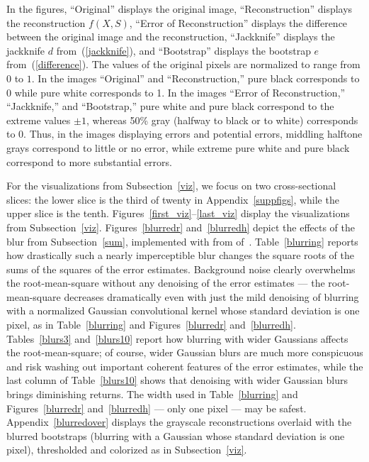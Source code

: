 \documentclass[article]{jdssv}
\begin{document}
In the figures,
``Original'' displays the original image,
``Reconstruction'' displays the reconstruction $f(X, S)$,
``Error of Reconstruction'' displays the difference between the original image
and the reconstruction,
``Jackknife'' displays the jackknife $d$ from~(\ref{jackknife}),
and ``Bootstrap'' displays the bootstrap $e$ from~(\ref{difference}).
The values of the original pixels are normalized to range from $0$ to $1$.
In the images ``Original'' and ``Reconstruction,''
pure black corresponds to 0 while pure white corresponds to 1.
In the images ``Error of Reconstruction,'' ``Jackknife,'' and ``Bootstrap,''
pure white and pure black correspond to the extreme values $\pm 1$,
whereas 50\% gray (halfway to black or to white) corresponds to 0.
Thus, in the images displaying errors and potential errors,
middling halftone grays correspond to little or no error, while
extreme pure white and pure black correspond to more substantial errors.

For the visualizations from Subsection~\ref{viz},
we focus on two cross-sectional slices:
the lower slice is the third of twenty in Appendix~\ref{suppfigs},
while the upper slice is the tenth.
Figures~\ref{first_viz}--\ref{last_viz} display the visualizations
from Subsection~\ref{viz}.
Figures~\ref{blurredr} and~\ref{blurredh} depict the effects
of the blur from Subsection~\ref{sum}, implemented
with 
from  of~\citet{scikit-image}.
Table~\ref{blurring} reports how drastically
such a nearly imperceptible blur changes
the square roots of the sums of the squares of the error estimates.
Background noise clearly overwhelms the root-mean-square without any denoising
of the error estimates --- the root-mean-square decreases dramatically
even with just the mild denoising of blurring
with a normalized Gaussian convolutional kernel
whose standard deviation is one pixel, as in Table~\ref{blurring}
and Figures~\ref{blurredr} and~\ref{blurredh}.
Tables~\ref{blurs3} and~\ref{blurs10} report how blurring with wider Gaussians
affects the root-mean-square; of course, wider Gaussian blurs
are much more conspicuous and risk washing out important coherent features
of the error estimates, while the last column of Table~\ref{blurs10} shows
that denoising with wider Gaussian blurs brings diminishing returns.
The width used in Table~\ref{blurring} and Figures~\ref{blurredr}
and~\ref{blurredh} --- only one pixel --- may be safest.
Appendix~\ref{blurredover} displays the grayscale reconstructions overlaid
with the blurred bootstraps (blurring with a Gaussian whose standard deviation
is one pixel), thresholded and colorized as in Subsection~\ref{viz}.
\end{document}
